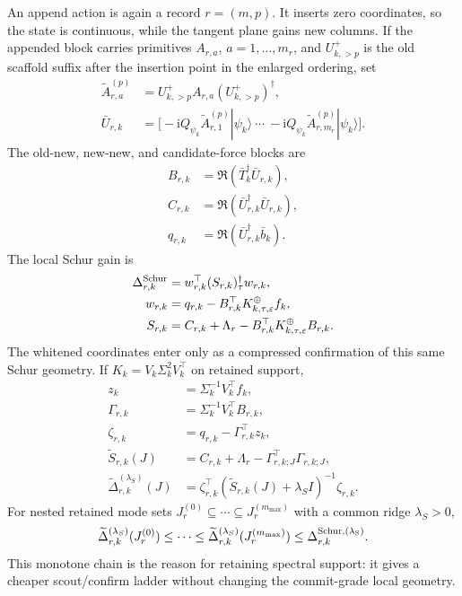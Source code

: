 \documentclass[
  reprint,
  amsmath,
  amssymb,
  aps,
  pra,
  nofootinbib,
  superscriptaddress,
  floatfix
]{revtex4-2}
\newcommand{\ii}{\mathrm{i}}
\newcommand{\eps}{\varepsilon}
\newcommand{\ket}[1]{|#1\rangle}
\begin{document}
An append action is again a record $r=(m,p)$. It inserts zero coordinates, so the state is continuous, while the tangent plane gains new columns. If the appended block carries primitives $A_{r,a}$, $a=1,\ldots,m_r$, and $U_{k,>p}^{+}$ is the old scaffold suffix after the insertion point in the enlarged ordering, set
\[
\begin{aligned}
\widetilde A_{r,a}^{(p)}
&=U_{k,>p}^{+}A_{r,a}(U_{k,>p}^{+})^\dagger,\\
\bar U_{r,k}
&=\bigl[
-\ii Q_{\psi_k}\widetilde A_{r,1}^{(p)}\ket{\psi_k}\ \cdots\
-\ii Q_{\psi_k}\widetilde A_{r,m_r}^{(p)}\ket{\psi_k}
\bigr].
\end{aligned}
\]
The old-new, new-new, and candidate-force blocks are
\begin{equation}
\begin{aligned}
B_{r,k}&=\Re(\bar T_k^\dagger\bar U_{r,k}),\\
C_{r,k}&=\Re(\bar U_{r,k}^\dagger\bar U_{r,k}),\\
q_{r,k}&=\Re(\bar U_{r,k}^\dagger\bar b_k).
\end{aligned}
\label{eq:append_blocks}
\end{equation}
The local Schur gain is
\begin{equation}
\begin{aligned}
\Delta_{r,k}^{\rm Schur}&=w_{r,k}^\top (S_{r,k})_{\tau}^{\dagger}w_{r,k},\\
w_{r,k}&=q_{r,k}-B_{r,k}^\top K_{k,\tau,\eps}^{\oplus}f_k,\\
S_{r,k}&=C_{r,k}+\Lambda_r-B_{r,k}^\top K_{k,\tau,\eps}^{\oplus}B_{r,k}.
\end{aligned}
\label{eq:append_gain_exact}
\end{equation}
The whitened coordinates enter only as a compressed confirmation of this same Schur geometry. If $K_k=V_k\Sigma_k^2V_k^\top$ on retained support,
\begin{equation}
\begin{aligned}
z_k&=\Sigma_k^{-1}V_k^\top f_k,\\
\Gamma_{r,k}&=\Sigma_k^{-1}V_k^\top B_{r,k},\\
\zeta_{r,k}&=q_{r,k}-\Gamma_{r,k}^{\top}z_k,\\
\widetilde S_{r,k}(J)&=C_{r,k}+\Lambda_r-\Gamma_{r,k;J}^{\top}\Gamma_{r,k;J},\\
\widetilde\Delta_{r,k}^{(\lambda_S)}(J)
&=\zeta_{r,k}^{\top}(\widetilde S_{r,k}(J)+\lambda_SI)^{-1}\zeta_{r,k}.
\end{aligned}
\label{eq:whitened_append}
\end{equation}
For nested retained mode sets $J_r^{(0)}\subseteq\cdots\subseteq J_r^{(m_{\max})}$ with a common ridge $\lambda_S>0$,
\begin{equation}
\widetilde\Delta_{r,k}^{(\lambda_S)}(J_r^{(0)})
\le\cdots\le
\widetilde\Delta_{r,k}^{(\lambda_S)}(J_r^{(m_{\max})})
\le
\Delta_{r,k}^{\rm Schur,(\lambda_S)} .
\label{eq:compressed_schur_chain}
\end{equation}
This monotone chain is the reason for retaining spectral support: it gives a cheaper scout/confirm ladder without changing the commit-grade local geometry.
\end{document}
